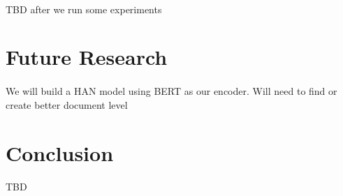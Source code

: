 \documentclass[10pt,a4paper,onecolumn]{article}
\begin{document}
\paragraph{}
TBD after we run some experiments


\section{Future Research}
\paragraph{}
We will build a HAN model using BERT as our encoder. Will need to find or create better document level 

\section{Conclusion}
\paragraph{}
TBD



\end{document}
